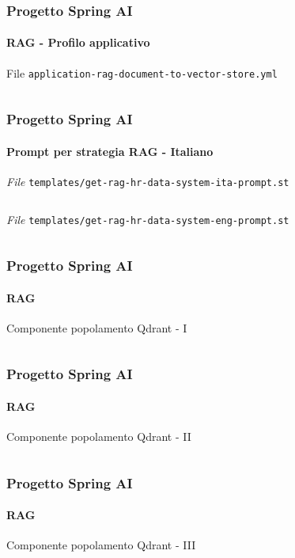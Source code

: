 %
\begin{frame}[t,fragile] \frametitle{Progetto Spring AI}
    \framesubtitle{RAG - Profilo applicativo}
        \begin{block}{File \texttt{application-rag-document-to-vector-store.yml}}
			{\tiny\inputminted{yaml}{code/application-rag-document-to-vector-store.yml}}
    	\end{block}
\end{frame}
%
\begin{frame}[t,fragile] \frametitle{Progetto Spring AI}
    \framesubtitle{Prompt per strategia RAG - Italiano}
        \begin{block}{\textit{File} \texttt{templates/get-rag-hr-data-system-ita-prompt.st}}
			{\scriptsize\inputminted{text}{code/get-rag-hr-data-system-ita-prompt.st}}
    	\end{block}
        \vspace*{.3cm}
        \begin{block}{\textit{File} \texttt{templates/get-rag-hr-data-system-eng-prompt.st}}
			{\scriptsize\inputminted{text}{code/get-rag-hr-data-system-eng-prompt.st}}
    	\end{block}
\end{frame}
%
\begin{frame}[t,fragile] \frametitle{Progetto Spring AI}
    \framesubtitle{RAG}
        \vspace*{-.7cm}
        \begin{block}{Componente popolamento Qdrant - I}
			{\tiny\inputminted{java}{code/DocumentDataLoader.java}}
    	\end{block}
\end{frame}
%
\begin{frame}[t,fragile] \frametitle{Progetto Spring AI}
    \framesubtitle{RAG}
        \vspace*{-.7cm}
        \begin{block}{Componente popolamento Qdrant - II}
			{\tiny\inputminted{java}{code/DocumentDataLoader-2.java}}
    	\end{block}
\end{frame}
%
\begin{frame}[t,fragile] \frametitle{Progetto Spring AI}
    \framesubtitle{RAG}
        \vspace*{-.7cm}
        \begin{block}{Componente popolamento Qdrant - III}
			{\tiny\inputminted{java}{code/DocumentDataLoader-3.java}}
    	\end{block}
\end{frame}
